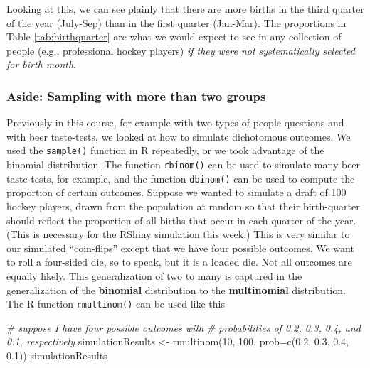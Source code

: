 \documentclass[
  openany]{book}
\newenvironment{Shaded}{\begin{snugshade}}{\end{snugshade}}
\newcommand{\AttributeTok}[1]{\textcolor[rgb]{0.77,0.63,0.00}{#1}}
\newcommand{\CommentTok}[1]{\textcolor[rgb]{0.56,0.35,0.01}{\textit{#1}}}
\newcommand{\DecValTok}[1]{\textcolor[rgb]{0.00,0.00,0.81}{#1}}
\newcommand{\FloatTok}[1]{\textcolor[rgb]{0.00,0.00,0.81}{#1}}
\newcommand{\FunctionTok}[1]{\textcolor[rgb]{0.00,0.00,0.00}{#1}}
\newcommand{\NormalTok}[1]{#1}
\newcommand{\OtherTok}[1]{\textcolor[rgb]{0.56,0.35,0.01}{#1}}
\begin{document}
Looking at this, we can see plainly that there are more births in the third quarter of the year (July-Sep) than in the first quarter (Jan-Mar). The proportions in Table \ref{tab:birthquarter} are what we would expect to see in any collection of people (e.g., professional hockey players) \emph{if they were not systematically selected for birth month}.

\hypertarget{aside-sampling-with-more-than-two-groups}{%
\subsubsection*{Aside: Sampling with more than two groups}\label{aside-sampling-with-more-than-two-groups}}

Previously in this course, for example with two-types-of-people questions and with beer taste-tests, we looked at how to simulate dichotomous outcomes. We used the \texttt{sample()} function in R repeatedly, or we took advantage of the binomial distribution. The function \texttt{rbinom()} can be used to simulate many beer taste-tests, for example, and the function \texttt{dbinom()} can be used to compute the proportion of certain outcomes. Suppose we wanted to simulate a draft of 100 hockey players, drawn from the population at random so that their birth-quarter should reflect the proportion of all births that occur in each quarter of the year. (This is necessary for the RShiny simulation this week.) This is very similar to our simulated ``coin-flips'' except that we have four possible outcomes. We want to roll a four-sided die, so to speak, but it is a loaded die. Not all outcomes are equally likely. This generalization of two to many is captured in the generalization of the \textbf{binomial} distribution to the \textbf{multinomial} distribution. The R function \texttt{rmultinom()} can be used like this

\begin{Shaded}
\begin{Highlighting}[]
\CommentTok{\# suppose I have four possible outcomes with}
\CommentTok{\# probabilities of 0.2, 0.3, 0.4, and 0.1, respectively}
\NormalTok{simulationResults }\OtherTok{\textless{}{-}} \FunctionTok{rmultinom}\NormalTok{(}\DecValTok{10}\NormalTok{, }\DecValTok{100}\NormalTok{, }\AttributeTok{prob=}\FunctionTok{c}\NormalTok{(}\FloatTok{0.2}\NormalTok{, }\FloatTok{0.3}\NormalTok{, }\FloatTok{0.4}\NormalTok{, }\FloatTok{0.1}\NormalTok{))}
\NormalTok{simulationResults}
\end{Highlighting}
\end{Shaded}
\end{document}
